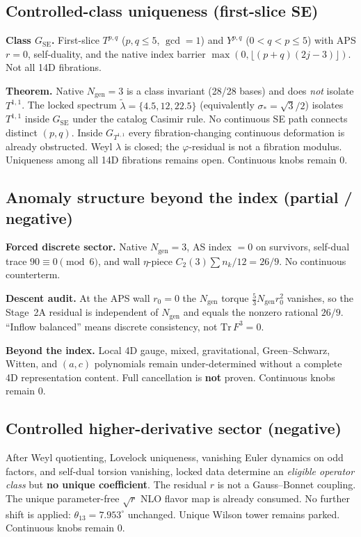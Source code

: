 \documentclass{article}
\begin{document}
\subsection{Controlled-class uniqueness (first-slice SE)}
\textbf{Class $G_{\mathrm{SE}}$.} First-slice $T^{p,q}$ ($p,q\le 5$,
$\gcd=1$) and $Y^{p,q}$ ($0<q<p\le 5$) with APS $r=0$, self-duality, and
the native index barrier $\max(0,\lfloor(p+q)(2j-3)\rfloor)$. Not all
14D fibrations.

\textbf{Theorem.} Native $N_{\mathrm{gen}}=3$ is a class invariant
(28/28 bases) and does \emph{not} isolate $T^{1,1}$. The locked
spectrum $\tilde\lambda=\{4.5,12,22.5\}$ (equivalently $\sigma_*=\sqrt3/2$)
isolates $T^{1,1}$ inside $G_{\mathrm{SE}}$ under the catalog Casimir
rule. No continuous SE path connects distinct $(p,q)$. Inside
$G_{T^{1,1}}$ every fibration-changing continuous deformation is already
obstructed. Weyl $\lambda$ is closed; the $\varphi$-residual is not a
fibration modulus. Uniqueness among all 14D fibrations remains open.
Continuous knobs remain 0.

\subsection{Anomaly structure beyond the index (partial / negative)}
\textbf{Forced discrete sector.} Native $N_{\mathrm{gen}}=3$,
AS index $=0$ on survivors, self-dual trace $90\equiv 0\pmod 6$, and
wall $\eta$-piece $C_2(3)\sum n_k/12=26/9$. No continuous counterterm.

\textbf{Descent audit.} At the APS wall $r_0=0$ the $N_{\mathrm{gen}}$
torque $\tfrac53 N_{\mathrm{gen}} r_0^2$ vanishes, so the Stage~2A
residual is independent of $N_{\mathrm{gen}}$ and equals the nonzero
rational $26/9$. ``Inflow balanced'' means discrete consistency, not
$\mathrm{Tr}\,F^3=0$.

\textbf{Beyond the index.} Local 4D gauge, mixed, gravitational,
Green--Schwarz, Witten, and $(a,c)$ polynomials remain under-determined
without a complete 4D representation content. Full cancellation is
\textbf{not} proven. Continuous knobs remain 0.

\subsection{Controlled higher-derivative sector (negative)}
After Weyl quotienting, Lovelock uniqueness, vanishing Euler dynamics on
odd factors, and self-dual torsion vanishing, locked data determine an
\emph{eligible operator class} but \textbf{no unique coefficient}.
The residual $r$ is not a Gauss--Bonnet coupling. The unique
parameter-free $\sqrt r$ NLO flavor map is already consumed.
No further shift is applied: $\theta_{13}=7.953^\circ$ unchanged.
Unique Wilson tower remains parked. Continuous knobs remain 0.
\end{document}
